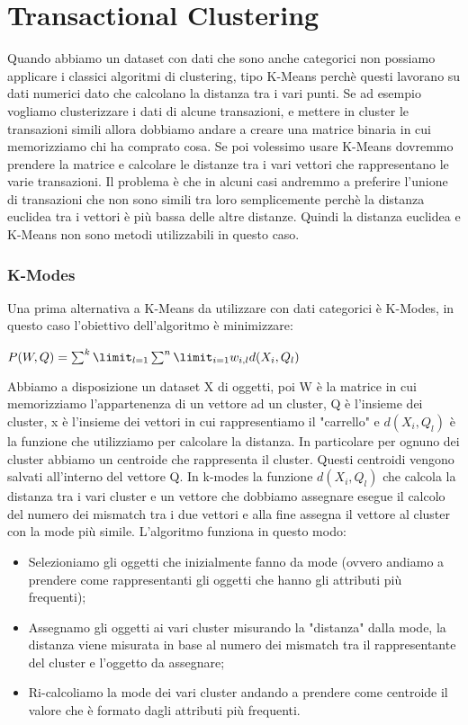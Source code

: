 \documentclass[14pt]{extreport}
\begin{document}
\chapter{Transactional Clustering}

Quando abbiamo un dataset con dati che sono anche categorici non possiamo applicare i classici algoritmi di clustering, tipo K-Means perchè questi lavorano su dati numerici dato che calcolano la distanza tra i vari punti.
Se ad esempio vogliamo clusterizzare i dati di alcune transazioni, e mettere in cluster le transazioni simili allora dobbiamo andare a creare una matrice binaria in cui memorizziamo chi ha comprato cosa.
Se poi volessimo usare K-Means dovremmo prendere la matrice e calcolare le distanze tra i vari vettori che rappresentano le varie transazioni. Il problema è che in alcuni casi andremmo a preferire l'unione di transazioni che non sono simili tra loro semplicemente perchè la distanza euclidea tra i vettori è più bassa delle altre distanze.
Quindi la distanza euclidea e K-Means non sono metodi utilizzabili in questo caso.

\subsection{K-Modes}

Una prima alternativa a K-Means da utilizzare con dati categorici è K-Modes, in questo caso l'obiettivo dell'algoritmo è minimizzare:
\newline
\centerline{$P(W,Q)=\sum^k \limit_{l=1} \sum^n \limit_{i=1} w_{i,l}d(X_i,Q_l)$}
Abbiamo a disposizione un dataset X di oggetti, poi W è la matrice in cui memorizziamo l'appartenenza di un vettore ad un cluster, Q è l'insieme dei cluster, x è l'insieme dei vettori in cui rappresentiamo il "carrello" e $d(X_i,Q_l)$ è la funzione che utilizziamo per calcolare la distanza.
In particolare per ognuno dei cluster abbiamo un centroide che rappresenta il cluster. Questi centroidi vengono salvati all'interno del vettore Q.
In k-modes la funzione $d(X_i,Q_l)$ che calcola la distanza tra i vari cluster e un vettore che dobbiamo assegnare esegue il calcolo del numero dei mismatch tra i due vettori e alla fine assegna il vettore al cluster con la mode più simile.
L'algoritmo funziona in questo modo:
\begin{itemize}
    \item Selezioniamo gli oggetti che inizialmente fanno da mode (ovvero andiamo a prendere come rappresentanti gli oggetti che hanno gli attributi più frequenti);
    \item Assegnamo gli oggetti ai vari cluster misurando la "distanza" dalla mode, la distanza viene misurata in base al numero dei mismatch tra il rappresentante del cluster e l'oggetto da assegnare;
    \item Ri-calcoliamo la mode dei vari cluster andando a prendere come centroide il valore che è formato dagli attributi più frequenti.
\end{itemize}
\end{document}
